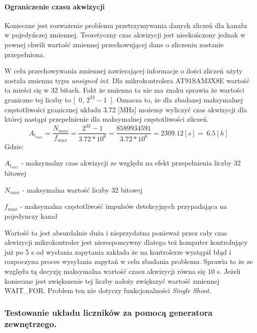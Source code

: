 \paragraph{Ograniczenie czasu akwizycji}

Konieczne jest rozważenie problemu przetrzymywania danych zliczeń dla kanału w pojedyńczej zmiennej. Teoretyczny czas akwizycji jest nieskończony jednak w pewnej chwili wartość zmiennej przechowującej dane o zliczeniu zostanie przepełniona.

W celu przechowywania zmiennej zawierającej informacje o ilości zliczeń użyty została zmienna typu \textit{unsigned int}. Dla mikrokontrolera AT91SAM3X8E wartość ta mieści się w 32 bitach. Fakt że zmienna ta nie ma znaku sprawia że wartości graniczne tej liczby to [~0, $2^{33}-1$~]. Oznacza to, że dla zbadanej maksymalnej częstotliwości granicznej układu 3.72 [MHz] możemy wyliczyć czas akwizycji dla której nastąpi przepełnienie dla maksymalnej częstotliwości zliczeń. 
\begin{equation}
        A_{t_{max}} = \frac{N_{max}}{f_{max}} = \frac{2^{33}-1}{3.72 * 10^{6}} = \frac{8589934591}{3.72 * 10^{6}} = 2309.12 [s] = ~6.5 [h]
\end{equation}
Gdzie:
\begin{description}
        \item $A_{t_{max}}$ - maksymalny czas akwizycji ze względu na efekt przepełnienia liczby 32 bitowej
        \item $N_{max}$ - maksymalna wartość liczby 32 bitowej
        \item $f_{max}$ - maksymalna częstotliwość impulsów detekcyjnych przypadająca na pojedynczy kanał
\end{description}

Wartość ta jest absurdalnie duża i nieprzydatna ponieważ przez cały czas akwizycji mikrokontroler jest nieresponsywny dlatego też komputer kontrolujący już po 5 s od wysłania zapytania zakłada że na kontrolerze wystąpił błąd i rozpoczyna proces wysyłania zapytań w celu zbadania problemu. Sprawia to że ze względu tą decyzję maksymalna wartość czasu akwizycji równa się 10 s. Jeżeli konieczne jest zwiększenie tej liczby należy zwiększyć wartość zmiennej WAIT\_FOR. Problem ten nie dotyczy funkcjonalności \textit{Single Shoot}.   

\subsubsection{Testowanie układu liczników za pomocą generatora zewnętrzego.}

